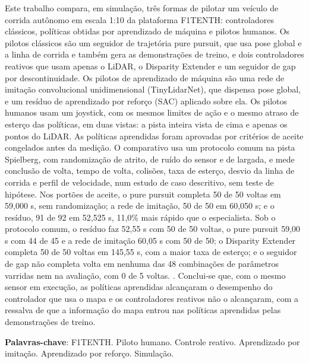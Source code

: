 
\setlength{\absparsep}{18pt} %
\begin{resumo}
 Este trabalho compara, em simulação, três formas de pilotar um veículo de
 corrida autônomo em escala 1:10 da plataforma F1TENTH: controladores
 clássicos, políticas obtidas por aprendizado de máquina e pilotos humanos. Os
 pilotos clássicos são um seguidor de trajetória pure pursuit, que usa pose
 global e a linha de corrida e também gera as demonstrações de treino, e dois
 controladores reativos que usam apenas o LiDAR, o Disparity Extender e um
 seguidor de gap por descontinuidade. Os pilotos de aprendizado de máquina são
 uma rede de imitação convolucional unidimensional (TinyLidarNet), que dispensa
 pose global, e um resíduo de aprendizado por reforço (SAC) aplicado sobre ela.
 Os pilotos humanos usam um joystick, com os mesmos limites de ação e o mesmo
 atraso de esterço das políticas, em duas vistas: a pista inteira vista de cima
 e apenas os pontos do LiDAR. As políticas aprendidas foram aprovadas por
 critérios de aceite congelados antes da medição. O comparativo usa um protocolo
 comum na pista Spielberg, com randomização de atrito, de ruído do sensor e de
 largada, e mede conclusão de volta, tempo de volta, colisões, taxa de esterço,
 desvio da linha de corrida e perfil de velocidade, num estudo de caso
 descritivo, sem teste de hipótese. Nos portões de aceite, o pure pursuit
 completa 50 de 50 voltas em 59,000 s, sem randomização; a rede de imitação, 50
 de 50 em 60,050 s; e o resíduo, 91 de 92 em 52,525 s, 11,0\% mais rápido que o
 especialista. Sob o protocolo comum, o resíduo faz 52,55 s com 50 de 50
 voltas, o pure pursuit 59,00 s com 44 de 45 e a rede de imitação 60,05 s com
 50 de 50; o Disparity Extender completa 50 de 50 voltas em 145,55 s, com a
 maior taxa de esterço; e o seguidor de gap não completa volta em nenhuma das 48
 combinações de parâmetros varridas nem na avaliação, com 0 de 5 voltas.
 .
 Conclui-se que, com o mesmo sensor em execução, as políticas aprendidas
 alcançaram o desempenho do controlador que usa o mapa e os controladores
 reativos não o alcançaram, com a ressalva de que a informação do mapa entrou nas
 políticas aprendidas pelas demonstrações de treino.

 \textbf{Palavras-chave}: F1TENTH. Piloto humano. Controle reativo.
 Aprendizado por imitação. Aprendizado por reforço. Simulação.
\end{resumo}

